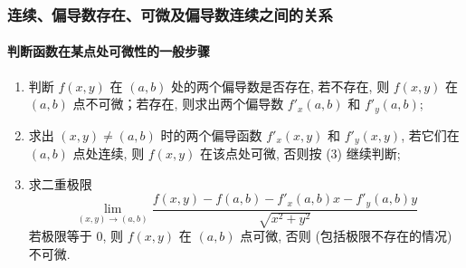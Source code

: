 \subsubsection{连续、偏导数存在、可微及偏导数连续之间的关系}

\begin{figure}[H]
    \centering
    \caption{}
\end{figure}

\paragraph{判断函数在某点处可微性的一般步骤}
\begin{enumerate}[label=(\arabic{*})]
    \item 判断 $f(x,y)$ 在 $(a,b)$ 处的两个偏导数是否存在, 若不存在, 则 $f(x,y)$ 在 $(a,b)$ 点不可微；若存在, 则求出两个偏导数 $f'_x(a,b)$ 和 $f'_y(a,b)$;
    \item 求出 $(x,y)\neq (a,b)$ 时的两个偏导函数 $f'_x(x,y)$ 和 $f'_y(x,y)$, 若它们在 $(a,b)$ 点处连续, 则 $f(x,y)$ 在该点处可微, 否则按 (3) 继续判断;
    \item 求二重极限 $$\lim_{(x,y)\to(a,b)}\dfrac{f(x,y)-f(a,b)-f'_x(a,b)x-f'_y(a,b)y}{\sqrt{x^2+y^2}}$$ 若极限等于 0, 则 $f(x,y)$ 在 $(a,b)$ 点可微, 否则 (包括极限不存在的情况) 不可微.
\end{enumerate}


